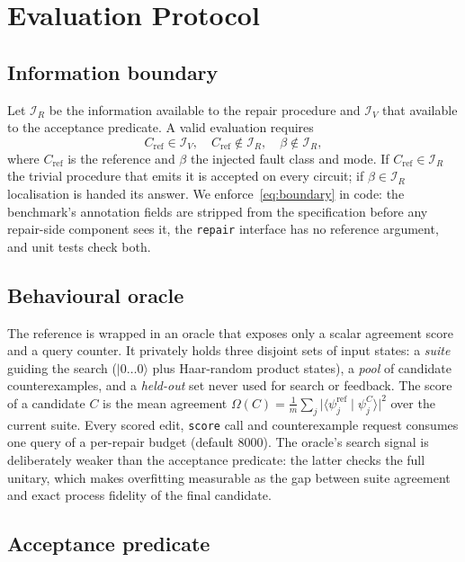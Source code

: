 \documentclass[journal]{IEEEtran}
\begin{document}
\section{Evaluation Protocol}
\label{sec:protocol}

\subsection{Information boundary}

Let $\mathcal{I}_R$ be the information available to the repair procedure and
$\mathcal{I}_V$ that available to the acceptance predicate. A valid evaluation
requires
\begin{equation}
\label{eq:boundary}
C_{\mathrm{ref}} \in \mathcal{I}_V,\quad C_{\mathrm{ref}} \notin \mathcal{I}_R,\quad
\beta \notin \mathcal{I}_R,
\end{equation}
where $C_{\mathrm{ref}}$ is the reference and $\beta$ the injected fault class
and mode. If $C_{\mathrm{ref}}\in\mathcal{I}_R$ the trivial procedure that emits
it is accepted on every circuit; if $\beta\in\mathcal{I}_R$ localisation is
handed its answer. We enforce~\eqref{eq:boundary} in code: the benchmark's
annotation fields are stripped from the specification before any repair-side
component sees it, the \texttt{repair} interface has no reference argument, and
unit tests check both.

\subsection{Behavioural oracle}

The reference is wrapped in an oracle that exposes only a scalar agreement score
and a query counter. It privately holds three disjoint sets of input states:
a \emph{suite} guiding the search ($\lvert 0\ldots0\rangle$ plus
Haar-random product states), a \emph{pool} of candidate counterexamples, and a
\emph{held-out} set never used for search or feedback. The score of a candidate
$C$ is the mean agreement $\Omega(C)=\tfrac{1}{m}\sum_{j}\lvert\langle
\psi^{\mathrm{ref}}_j\mid\psi^{C}_j\rangle\rvert^2$ over the current suite.
Every scored edit, \texttt{score} call and counterexample request consumes one
query of a per-repair budget (default 8000). The oracle's search signal is
deliberately weaker than the acceptance predicate: the latter checks the full
unitary, which makes overfitting measurable as the gap between suite agreement
and exact process fidelity of the final candidate.

\subsection{Acceptance predicate}
\end{document}
